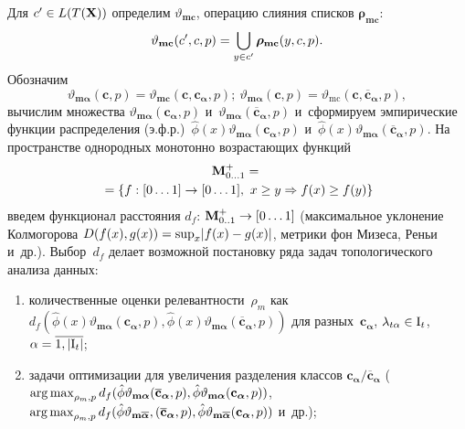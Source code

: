 \begin{multicols}{2}
     Для $c^\prime\hm\in L(T(\mathbf{X}))$ определим 
$\vartheta_{\mathbf{mc}}$, операцию слияния списков 
$\bm{\rho}_{\mathbf{mc}}$:
$$
\vartheta_{\mathbf{mc}}(c^\prime, c, 
{p})\hm= \bigcup\limits_{y\in c^\prime} \bm{\rho}_{\mathbf{mc}} (y,c, 
{p}).
$$
 Обозначим 
 $$
 \vartheta_{\mathbf{m}\bm{\alpha}}(\mathbf{c}, 
{p}) \!=\! \vartheta_{\mathbf{mc}}(\mathbf{c}, 
\mathbf{c}_{\bm{\alpha}}, {p});\ 
\vartheta_{\mathbf{m}\bm{\alpha}}(\mathbf{c},{p})\!=\! 
\vartheta_{\mathrm{mc}}(\mathbf{c}, \overline{\mathbf{c}}_{\bm \alpha}, 
{p}),
$$
 вычислим множества $\vartheta_{\mathbf{m}{\bm \alpha}} 
(\mathbf{c}_{\bm \alpha}, {p})$ и~$\vartheta_{\mathbf{m}{\bm \alpha}} 
(\overline{\mathbf{c}}_{\bm \alpha},{p})$ и~сформируем 
эмпирические функции распределения (э.ф.р.)\ $\hat{\phi}(x) 
\vartheta_{\mathbf{m}{\bm \alpha}} (\mathbf{c}_{\bm \alpha}, {p})$ 
и~$\hat{\phi}(x) \vartheta_{\mathbf{m}{\bm \alpha}} 
(\overline{\mathbf{c}}_{\bm \alpha}, {p})$. На пространстве 
однородных монотонно возрастающих функций 
\begin{multline*}
\mathbf{M}^+_{0\ldots1} ={}\\
{}= 
\{f: [0\ldots 1]\hm\to [0\ldots 1],\ x\geq y\hm\Rightarrow f(x)\geq f(y)\}
\end{multline*}
введем 
функционал расстояния $d_f$: $\mathbf{M}^+_{0..1}\hm\to [0\ldots 1]$ 
(максимальное уклонение Колмогорова $D(f(x), g(x))\hm= \mathrm{sup}_x 
\vert f(x)\hm- g(x)\vert$, метрики фон Мизеса, Реньи и~др.). Выбор~$d_f$ 
делает возможной постановку ряда задач топологического анализа данных:
     \begin{enumerate}[(1)]
\item количественные оценки релевантности~$\rho_m$ как 
$d_f(\hat{\phi}(x)\vartheta_{\mathbf{m}{\bm \alpha}}(\mathbf{c}_{\bm \alpha}, 
{p}), \hat{\phi}(x)\vartheta_{\mathbf{m}{\bm 
\alpha}}(\overline{\mathbf{c}}_{\bm \alpha}, {p}))$ для 
разных~$\mathbf{c}_{\bm \alpha}$, $\lambda_{t\alpha} \hm\in \mathrm{I}_t$, 
$\alpha \hm= \overline{1, \vert \mathrm{I}_t\vert}$;
\item задачи оптимизации для увеличения разделения классов 
$\mathbf{c}_{\bm \alpha}/\overline{\mathbf{c}}_{\bm \alpha}$ 
($\mathop{\mathrm{arg}\,\mathrm{max}}_{\rho_m,{p}} d_f(\hat{\phi}\vartheta_{\mathbf{m}{\bm \alpha}}(\overline{\mathbf{c}}_{\bm \alpha},{p}), 
\hat{\phi}\vartheta_{\mathbf{m}{\bm \alpha}}(\mathbf{c}_{\bm \alpha}, {p}))$,
$\mathop{\mathrm{arg}\,\mathrm{max}}_{\rho_m,{p}} d_f(\hat{\phi}\vartheta_{\mathbf{m}\overline{\bm{\alpha}}}, (\overline{\mathbf{c}}_{\bm \alpha}, {p}), 
\hat{\phi}\vartheta_{\mathbf{m}\overline{\bm \alpha}}
(\mathbf{c}_{\bm \alpha}, {p}))$  и~др.);

\end{enumerate}
\end{multicols}
